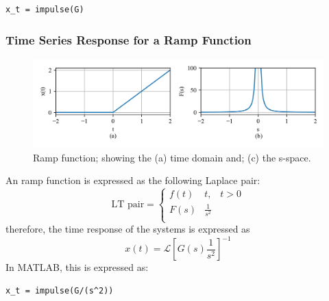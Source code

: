 \documentclass[12pt,letter]{article}
\numberwithin{ex}{section} %
\numberwithin{re}{section} %
\newcommand{\Laplace}[1]{\ensuremath{\mathcal{L}{\left[#1\right]}}}
\numberwithin{equation}{section}	%
\begin{document}
\lstset{linewidth=5.8in}
\begin{minipage}{1\textwidth}
  \begin{center}
\begin{lstlisting}
x_t = impulse(G)
\end{lstlisting}
  \end{center}
\end{minipage}


\subsubsection{Time Series Response for a Ramp Function}



		\begin{figure}[H]
			\centering
			\includegraphics[width=6.5in]{../figures/T_and_S_space_ramp_function}
			\caption{Ramp function; showing the (a) time domain and; (c) the s-space.}
			\label{fig:T_and_S_space_ramp_function}
		\end{figure}

An ramp function is expressed as the following Laplace pair:
		\begin{equation}
		\text{LT pair} =
			\begin{cases}
			f(t) & t, \; \; \; t>0 \\
			F(s) & \frac{1}{s^2} \\
			\end{cases}
		\end{equation}
therefore, the time response of the systems is expressed as
\begin{equation}
x(t) = \Laplace{G(s) \frac{1}{s^2}}^{-1}
\end{equation}
In MATLAB, this is expressed as:

\lstset{linewidth=5.8in}
\begin{minipage}{1\textwidth}
  \begin{center}
\begin{lstlisting}
x_t = impulse(G/(s^2))
\end{lstlisting}
  \end{center}
\end{minipage}
\end{document}
